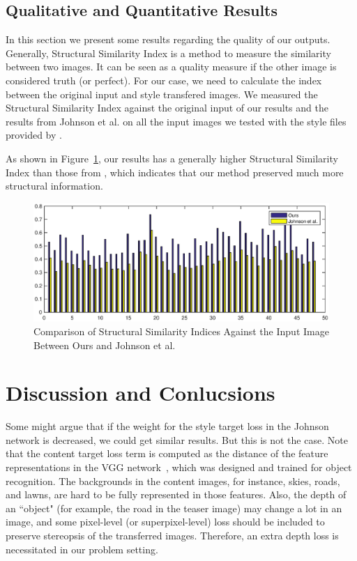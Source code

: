 \documentclass[10pt,twocolumn,letterpaper]{article}
\begin{document}
\subsection{Qualitative and Quantitative Results}
In this section we present some results regarding the quality of our outputs. Generally, Structural Similarity Index is a method to measure the similarity between two images. It can be seen as a quality measure if the other image is considered truth (or perfect). For our case, we need to calculate the index between the original input and style transfered images. We measured the Structural Similarity Index against the original input of our results and the results from Johnson et al. \cite{johnson2016perceptual} on all the input images we tested with the style files provided by \cite{johnson2016perceptual}.

As shown in Figure~\ref{fig:ssim}, our results has a generally higher Structural Similarity Index than those from \cite{johnson2016perceptual}, which indicates that our method preserved much more structural information.

\begin{figure}
\centering
\includegraphics[scale=0.7]{ssim.eps}
\caption{Comparison of Structural Similarity Indices Against the Input Image Between Ours and Johnson et al. \cite{johnson2016perceptual}}
\label{fig:ssim}
\end{figure}

\section{Discussion and Conlucsions}

Some might argue that if the weight for the style target loss in the Johnson \etal~\cite{johnson2016perceptual} network is decreased, we could get similar results. But this is not the case. Note that the content target loss term is computed as the distance of the feature representations in the VGG network~\cite{simonyan2014very}, which was designed and trained for object recognition. The backgrounds in the content images, for instance, skies, roads, and lawns, are hard to be fully represented in those features. Also, the depth of an ``object" (for example, the road in the teaser image) may change a lot in an image, and some pixel-level (or superpixel-level) loss should be included to preserve stereopsis of the transferred images. Therefore, an extra depth loss is necessitated in our problem setting.  
\end{document}
